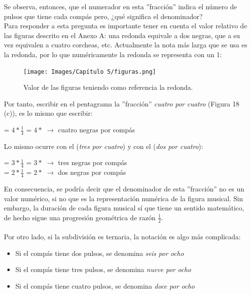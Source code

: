 \documentclass[a4paper, openright, 11pt, titlepage]{report}
\theoremstyle{definition}\newtheorem{defin}[propo]{Definition}
\theoremstyle{definition}\newtheorem{obser}[propo]{Remark}
\theoremstyle{definition}\newtheorem{ejem}[propo]{Ejemplo}
\theoremstyle{definition}\newtheorem{algoritmo}[propo]{Algoritmo}
\begin{document}
Se observa, entonces, que el numerador en esta ''fracción'' indica el número de pulsos que tiene cada compás pero, ¿qué significa el denominador?\\ 
Para responder a esta pregunta es importante tener en cuenta el valor relativo de las figuras descrito en el Anexo A: una redonda equivale a dos negras, que a su vez equivalen a cuatro corcheas, etc. Actualmente la nota más larga que se usa es la redonda, por lo que numéricamente la redonda se representa con un 1:
\begin{figure}[H]
    \centering
    \texttt{[image: Images/Capítulo 5/figuras.png]}
    \caption{Valor de las figuras teniendo como referencia la redonda.}
    \label{redonda}
\end{figure}
Por tanto, escribir en el pentagrama la ''fracción'' \textit{cuatro por cuatro} (Figura 18 (c)), es lo mismo que escribir:
\begin{center}
     = $4 * \frac{1}{4}$ = $4 * $\musQuarter \hspace{0.3cm} $\longrightarrow$ \hspace{0.3cm} cuatro negras por compás
\end{center}
Lo mismo ocurre con el  (\textit{tres por cuatro}) y con el  (\textit{dos por cuatro}):
\begin{center}
     = $3 * \frac{1}{4}$ = $3 * $\musQuarter \hspace{0.3cm} $\longrightarrow$ \hspace{0.3cm} tres negras por compás\\
     = $2 * \frac{1}{4}$ = $2 * $\musQuarter \hspace{0.3cm} $\longrightarrow$ \hspace{0.3cm} dos negras por compás
\end{center}
En consecuencia, se podría decir que el denominador de esta ''fracción'' no es un valor numérico, si no que es la representación numérica de la figura musical. Sin embargo, la duración de cada figura musical sí que tiene un sentido matemático, de hecho sigue una progresión geométrica de razón $\frac{1}{2}$.\\\\
Por otro lado, si la subdivisión es ternaria, la notación es algo más complicada: 
\begin{itemize}
    \item Si el compás tiene dos pulsos, se denomina \textit{seis por ocho}
    \item Si el compás tiene tres pulsos, se denomina \textit{nueve por ocho}
    \item Si el compás tiene cuatro pulsos, se denomina \textit{doce por ocho}
\end{itemize}
\end{document}
